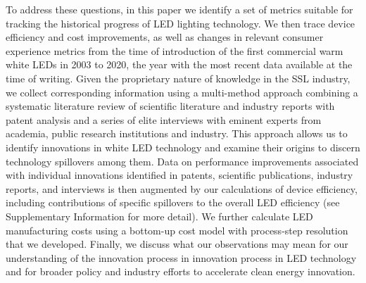 \documentclass[journal=jacsat,manuscript=article]{achemso}
\begin{document}
To address these questions, in this paper we identify a set of metrics suitable for tracking the historical progress of LED lighting technology. We then trace device efficiency and cost improvements, as well as changes in relevant consumer experience metrics from the time of introduction of the first commercial warm white LEDs in 2003 to 2020, the year with the most recent data available at the time of writing. Given the proprietary nature of knowledge in the SSL industry, we collect corresponding information using a multi-method approach combining a systematic literature review of scientific literature and industry reports with patent analysis and a series of elite interviews \cite{tansey2009process} with eminent experts from academia, public research institutions and industry. This approach allows us to identify innovations in white LED technology and examine their origins to discern technology spillovers among them. Data on performance improvements associated with individual innovations identified in patents, scientific publications, industry reports, and interviews is then augmented  by our calculations of device efficiency, including contributions of specific spillovers to the overall LED efficiency (see Supplementary Information for more detail). We further calculate LED manufacturing costs using a bottom-up cost model with process-step resolution that we developed. Finally, we discuss what our observations may mean for our understanding of the innovation process in innovation process in LED technology and for broader policy and industry efforts to accelerate clean energy innovation.
\end{document}
